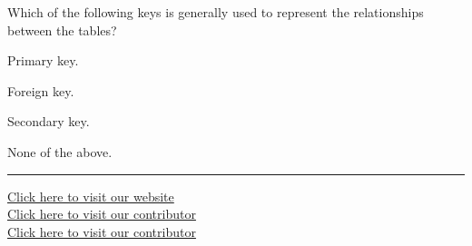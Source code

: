 \documentclass[11pt,a4paper]{article}
\begin{document}
\begin{parts}
  \item Which of the following keys is generally used to represent the relationships between the tables?
  \begin{parts}
    \item Primary key.
    \item Foreign key.
    \item Secondary key.
    \item None of the above.
  \end{parts}
\end{parts}

\vfill
\rule{\linewidth}{0.4pt}
\begin{center}\small
\href{https://bhu-exam.vercel.app/}{Click here to visit our website}\\[4pt]\href{https://me-aryan.vercel.app/}{Click here to visit our contributor}\\[4pt]\href{https://quashan-me.vercel.app/}{Click here to visit our contributor}
\end{center}
\end{document}
